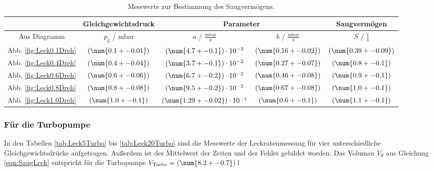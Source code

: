 \begin{table}[H]
   \centering
   \caption{Messwerte zur Bestimmung des Saugvermögens.}
   \label{tab:SaugLeckDreh}
   \begin{tabular}{c|c|c|c|c}
     & Gleichgewichtsdruck & \multicolumn{2}{c|}{Parameter} & Saugvermögen \\
     \hline
     Aus Diagramm & $p_\text{g}$ / mbar & $a$ / $\frac{\text{mbar}}{\text{s}}$ & $b$ / $\frac{\text{mbar}}{\text{s}}$ & $S$ / $\frac{\text{l}}{\text{s}}$ \\
     \hline
     Abb. \eqref{fig:Leck0.1Dreh} & $(\num{0.1 +- 0.01})$ & $(\num{4.7 +- 0.1}) \cdot 10^{-3}$ & $(\num{0.16 +- 0.02})$ & $(\num{0.39 +- 0.09})$ \\
     Abb. \eqref{fig:Leck0.4Dreh} & $(\num{0.4 +- 0.04})$ & $(\num{3.7 +- 0.1}) \cdot 10^{-2} $ & $(\num{0.27 +- 0.07}) $ & $(\num{0.8 +- 0.1}) $ \\
     Abb. \eqref{fig:Leck0.6Dreh} & $(\num{0.6 +- 0.06})$ & $(\num{6.7 +- 0.2}) \cdot 10^{-2} $ & $(\num{0.46 +- 0.08}) $ & $(\num{0.9 +- 0.1}) $ \\
     Abb. \eqref{fig:Leck0.8Dreh} & $(\num{0.8 +- 0.08})$ & $(\num{9.5 +- 0.2}) \cdot 10^{-2} $ & $(\num{0.67 +- 0.08}) $ & $(\num{1.0 +- 0.1}) $ \\
     Abb. \eqref{fig:Leck1.0Dreh} & $(\num{1.0 +- 0.1})$ & $(\num{1.29 +- 0.02}) \cdot 10^{-1} $ & $(\num{0.6 +- 0.1}) $ & $(\num{1.1 +- 0.1}) $ \\
 \end{tabular}
\end{table}

\subsubsection{Für die Turbopumpe}
In den Tabellen \eqref{tab:Leck5Turbo} bis \eqref{tab:Leck20Turbo} sind die Messwerte der Leckratenmessung für vier unterschiedliche Gleichgewichtsdrücke aufgetragen. Außerdem ist der Mittelwert der Zeiten und der Fehler gebildet worden. Das Volumen $V_0$ aus Gleichung \eqref{eqn:SaugLeck} entspricht für die Turbopumpe $V_\text{Turbo} = (\num{8.2 +- 0.7})$\,l

